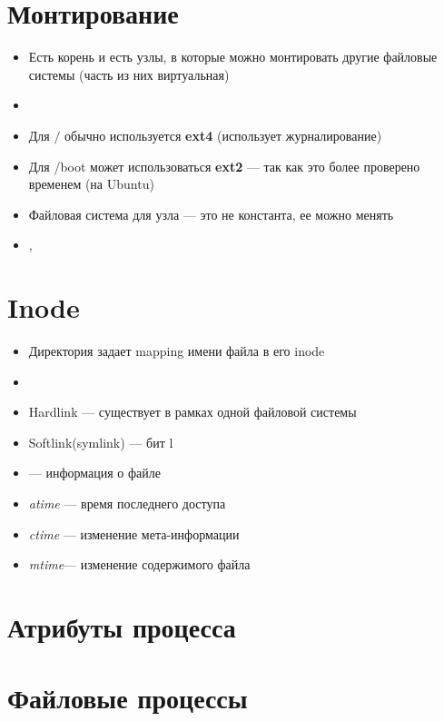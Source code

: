 \documentclass[../../lectures.tex]{subfiles}
\begin{document}
\section{Монтирование}
\begin{itemize}
    \item Есть корень и есть узлы, в которые можно монтировать другие файловые системы (часть из них виртуальная)
    \item {}
    \item Для $/$ обычно используется \textbf{ext4} (использует журналирование)
    \item Для /boot может использоваться \textbf{ext2} --- так как это более проверено временем (на Ubuntu)
    \item Файловая система для узла --- это не константа, ее можно менять
    \item {}, 
\end{itemize}

\section{Inode}
\begin{itemize}
    \item Директория задает mapping имени файла в его inode
    \item {}
    \item Hardlink --- существует в рамках одной файловой системы
    \item Softlink(symlink) --- бит l
    \item {} --- информация о файле
    \item \emph{atime} --- время последнего доступа
    \item \emph{ctime} --- изменение мета-информации
    \item \emph{mtime}--- изменение содержимого файла
\end{itemize}

\section{Атрибуты процесса}
\todo{}

\section{Файловые процессы}
\todo{}
\end{document}
